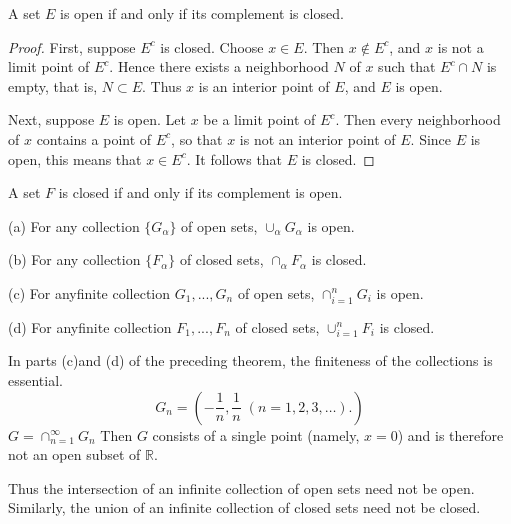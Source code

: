 \begin{thm}
    A set $E$ is open if and only if its complement is closed.
\end{thm}

\begin{proof}
    First, suppose $E^c$ is closed. Choose $x \in E$. Then $x \not\in E^c$, and $x$ is not a limit point of $E^c$. Hence there exists a neighborhood $N$ of $x$ such that $E^c \cap N$ is empty, that is, $N \subset E$. Thus $x$ is an interior point of $E$, and $E$ is open.
    
    Next, suppose $E$ is open. Let $x$ be a limit point of $E^c$. Then every neighborhood of $x$ contains a point of $E^c$, so that $x$ is not an interior point of $E$. Since $E$ is open, this means that $x \in E^c$. It follows that $E$ is closed.
\end{proof}

\begin{myCorollary}
    A set $F$ is closed if and only if its complement is open.
\end{myCorollary}


\begin{thm}
    (a) For any collection $\{G_\alpha\}$ of open sets,  $\cup_\alpha G_\alpha$ is open.

    (b) For any collection $\{F_\alpha\}$ of closed sets, $\cap_\alpha F_\alpha$ is closed.

    (c) For anyfinite collection $G_1, ..., G_n$ of open sets, $\cap_{i=1}^n G_i$ is open.

    (d) For anyfinite collection $F_1, ..., F_n$ of closed sets, $\cup_{i=1}^n F_i$ is closed.
\end{thm}

\begin{myExample}
    In parts (c)and (d) of the preceding theorem, the finiteness of the collections is essential.
    \begin{equation*}
        G_n = \left(-\frac{1}{n}, \frac{1}{n} \; (n=1,2,3,\dots). \right)
    \end{equation*}
    $G = \cap_{n=1}^\infty G_n$
    Then $G$ consists of a single point (namely, $x = 0$) and is therefore not an open subset of $\mathbb{R}$.
    
    Thus the intersection of an infinite collection of open sets need not be open. Similarly, the union of an infinite collection of closed sets need not be closed.
\end{myExample}

